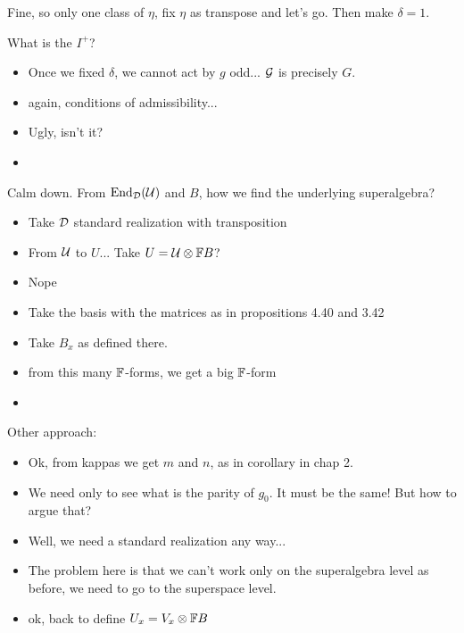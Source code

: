 Fine, so only one class of $\eta$, fix $\eta$ as transpose and let's go. 
Then make $\delta = 1$. 

What is the $I^+$? 

\begin{itemize}
    \item Once we fixed $\delta$, we cannot act by $g$ odd... $\mathcal G$ is precisely $G$.
    \item again, conditions of admissibility...
    \item Ugly, isn't it?
    \item 
\end{itemize}

Calm down. 
From $\operatorname{End}_{\mathcal{D}}(\mathcal U)$ and $B$, how we find the underlying superalgebra?

\begin{itemize}
    \item Take $\mathcal{D}$ standard realization with transposition
    \item From $\mathcal U$ to $U$... Take $U = \mathcal U \otimes \mathbb{F} B$?
    \item Nope
    \item Take the basis with the matrices as in propositions 4.40 and 3.42
    \item Take $B_x$ as defined there.
    \item from this many $\mathbb{F}$-forms, we get a big $\mathbb{F}$-form
    \item 
\end{itemize}

Other approach:

\begin{itemize}
    \item Ok, from kappas we get $m$ and $n$, as in corollary in chap 2.
    \item We need only to see what is the parity of $g_0$. 
    It must be the same! 
    But how to argue that?
    \item Well, we need a standard realization any way...
    \item The problem here is that we can't work only on the superalgebra level as before, we need to go to the superspace level.
    \item ok, back to define $U_x = V_x \otimes \mathbb{F} B$
\end{itemize}